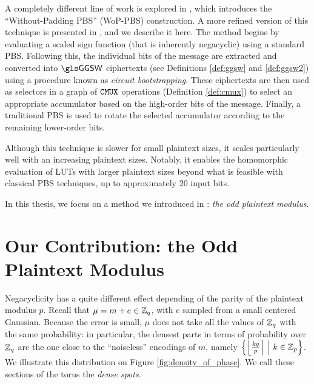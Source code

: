 A completely different line of work is explored in \cite{AC:CLOT21}, which introduces the “Without-Padding \gls{PBS}” (\gls{WoP-PBS}) construction. A more refined version of this technique is presented in \cite{JC:BBBCLO23}, and we describe it here. The method begins by evaluating a scaled sign function (that is inherently negacyclic) using a standard \gls{PBS}. Following this, the individual bits of the message are extracted and converted into $\GGSW$ ciphertexts (see Definitions \ref{def:ggsw} and \ref{def:ggsw2}) using a procedure known as \textit{circuit bootstrapping}. These ciphertexts are then used as selectors in a graph of $\texttt{CMUX}$ operations (Definition \ref{def:cmux}) to select an appropriate accumulator based on the high-order bits of the message. Finally, a traditional \gls{PBS} is used to rotate the selected accumulator according to the remaining lower-order bits.

Although this technique is slower for small plaintext sizes, it scales particularly well with an increasing plaintext sizes. Notably, it enables the homomorphic evaluation of LUTs with larger plaintext sizes beyond what is feasible with classical \gls{PBS} techniques, up to approximately 20 input bits.


In this thesis, we focus on a method we introduced in \cite{TCHES:BonPoiRiv24}: \textit{the odd plaintext modulus}.

\section{Our Contribution: the Odd Plaintext Modulus}
\label{sec:odd_modulus}

Negacyclicity has a quite different effect depending of the parity of the plaintext modulus $p$. Recall that $\mu = m + e \in \mathbb{Z}_q$, with $e$ sampled from a small centered Gaussian. Because the error is small, $\mu$ does not take all the values of $\mathbb{Z}_q$ with the same probability: in particular, the densest parts in terms of probability over $\mathbb{Z}_q$ are the one close to the ``noiseless'' encodings of $m$, namely $\left \{ \left \lfloor \frac {k q}{p} \right \rceil ~\middle |~ k \in \mathbb{Z}_p \right \}$. We illustrate this distribution on Figure \ref{fig:density_of_phase}. We call these sections of the torus the \emph{dense spots}.


